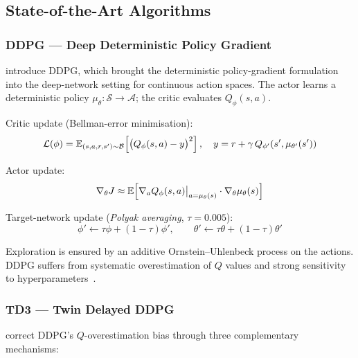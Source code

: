 \subsection{State-of-the-Art Algorithms}
\label{sec:algorithms}

\subsubsection{DDPG — Deep Deterministic Policy Gradient}

\textcite{Lillicrap2016} introduce DDPG, which brought the deterministic
policy-gradient formulation into the deep-network setting for continuous action
spaces. The actor learns a deterministic policy
$\mu_\theta : \mathcal{S} \to \mathcal{A}$; the critic evaluates $Q_\phi(s,a)$.

Critic update (Bellman-error minimisation):
\begin{equation}
  \mathcal{L}(\phi) = \mathbb{E}_{(s,a,r,s') \sim \mathcal{B}}\!\left[\bigl(Q_\phi(s,a) - y\bigr)^2\right],
  \quad y = r + \gamma\,Q_{\phi'}(s', \mu_{\theta'}(s'))
  \label{eq:ddpg_critic}
\end{equation}

Actor update:
\begin{equation}
  \nabla_\theta J \approx \mathbb{E}\!\left[\nabla_a Q_\phi(s,a)\big|_{a=\mu_\theta(s)}
  \cdot \nabla_\theta \mu_\theta(s)\right]
  \label{eq:ddpg_actor}
\end{equation}

Target-network update (\textit{Polyak averaging}, $\tau = 0.005$):
\begin{equation}
  \phi' \leftarrow \tau\phi + (1-\tau)\phi', \qquad
  \theta' \leftarrow \tau\theta + (1-\tau)\theta'
  \label{eq:polyak}
\end{equation}

Exploration is ensured by an additive Ornstein--Uhlenbeck process on the
actions. DDPG suffers from systematic overestimation of $Q$ values and strong
sensitivity to hyperparameters~\parencite{Fujimoto2018}.

\subsubsection{TD3 — Twin Delayed DDPG}

\textcite{Fujimoto2018} correct DDPG's $Q$-overestimation bias through three
complementary mechanisms:

